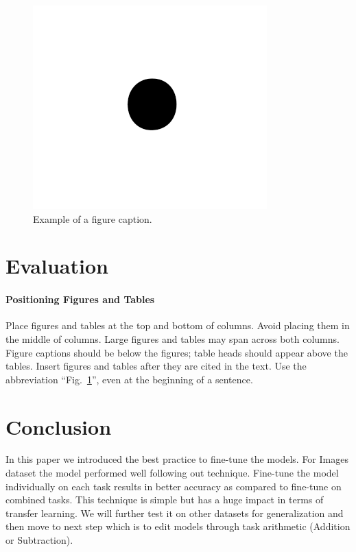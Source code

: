 \documentclass[conference]{IEEEtran}
\begin{document}
\begin{figure}[htbp]
\centerline{\includegraphics{fig1.png}}
\caption{Example of a figure caption.}
\label{fig}
\end{figure}


\section{Evaluation}
\paragraph{Positioning Figures and Tables} Place figures and tables at the top and 
bottom of columns. Avoid placing them in the middle of columns. Large 
figures and tables may span across both columns. Figure captions should be 
below the figures; table heads should appear above the tables. Insert 
figures and tables after they are cited in the text. Use the abbreviation 
``Fig.~\ref{fig}'', even at the beginning of a sentence.

\section{Conclusion}
In this paper we introduced the best practice to fine-tune the models. For Images dataset the model performed well following out technique. Fine-tune the model individually on each task results in better accuracy as compared to fine-tune on combined tasks. This technique is simple but has a huge impact in terms of transfer learning. We will further test it on other datasets for generalization and then move to next step which is to edit models through task arithmetic (Addition or Subtraction).
\end{document}
